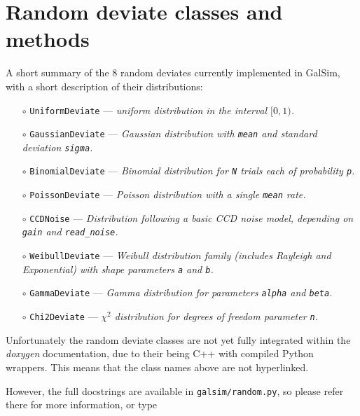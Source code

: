 \documentclass[preprint,11pt]{aastex}
\begin{document}
\section{Random deviate classes and methods}\label{sect:random}
A short summary of the 8 random deviates currently implemented in GalSim,
with a short description of their distributions:
\begin{itemize}

\item[$\circ$] \texttt{UniformDeviate} --- \emph{uniform distribution in the
  interval $[0, 1)$.}

\item[$\circ$] \texttt{GaussianDeviate} --- \emph{Gaussian distribution
with \texttt{mean} and standard deviation \texttt{sigma}.}

\item[$\circ$] \texttt{BinomialDeviate} --- \emph{Binomial
    distribution for \texttt{N} trials each of probability \texttt{p}.}

\item[$\circ$] \texttt{PoissonDeviate} --- \emph{Poisson distribution
    with a single \texttt{mean} rate.}

\item[$\circ$] \texttt{CCDNoise}  --- \emph{Distribution following a
    basic CCD noise model, depending on \texttt{gain} and \texttt{read\_noise}.}

\item[$\circ$] \texttt{WeibullDeviate} --- \emph{Weibull distribution
    family (includes Rayleigh and Exponential) with shape parameters \texttt{a} and \texttt{b}.}

\item[$\circ$] \texttt{GammaDeviate} --- \emph{Gamma distribution for
    parameters \texttt{alpha} and \texttt{beta}.}

\item[$\circ$] \texttt{Chi2Deviate} --- \emph{$\chi^2$ distribution
    for degrees of freedom parameter \texttt{n}.}

\end{itemize}

Unfortunately the random deviate classes are not yet fully integrated within
the \emph{doxygen} documentation, due to their being C++ with compiled
Python wrappers.  This means that the class names above are not
hyperlinked.

However, the full docstrings are available in
\texttt{galsim/random.py}, so please refer there for more information,
or type
\end{document}
